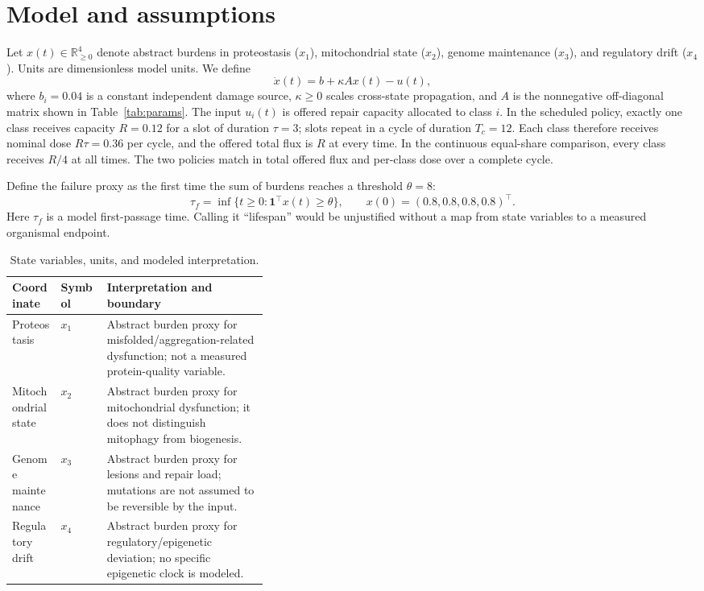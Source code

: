 \documentclass[10pt,letterpaper]{article}
\begin{document}
\section{Model and assumptions}
Let $x(t)\in\mathbb{R}_{\geq0}^{4}$ denote abstract burdens in proteostasis ($x_1$), mitochondrial state ($x_2$), genome maintenance ($x_3$), and regulatory drift ($x_4$). Units are dimensionless model units. We define
\begin{equation}
\dot{x}(t)=b+\kappa A x(t)-u(t), \label{eq:dyn}
\end{equation}
where $b_i=0.04$ is a constant independent damage source, $\kappa\geq0$ scales cross-state propagation, and $A$ is the nonnegative off-diagonal matrix shown in Table~\ref{tab:params}. The input $u_i(t)$ is offered repair capacity allocated to class $i$. In the scheduled policy, exactly one class receives capacity $R=0.12$ for a slot of duration $\tau=3$; slots repeat in a cycle of duration $T_c=12$. Each class therefore receives nominal dose $R\tau=0.36$ per cycle, and the offered total flux is $R$ at every time. In the continuous equal-share comparison, every class receives $R/4$ at all times. The two policies match in total offered flux and per-class dose over a complete cycle.

Define the failure proxy as the first time the sum of burdens reaches a threshold $\theta=8$:
\begin{equation}
\tau_f=\inf\{t\geq0:\mathbf{1}^{\top}x(t)\geq\theta\}, \qquad x(0)=(0.8,0.8,0.8,0.8)^{\top}. \label{eq:threshold}
\end{equation}
Here $\tau_f$ is a model first-passage time. Calling it “lifespan” would be unjustified without a map from state variables to a measured organismal endpoint.

\begin{table}[H]
\centering\small
\caption{State variables, units, and modeled interpretation.}
\label{tab:states}
\begin{tabularx}{\linewidth}{p{0.19\linewidth}p{0.18\linewidth}X}
\toprule
\textbf{Coordinate} & \textbf{Symbol} & \textbf{Interpretation and boundary}\\
\midrule
Proteostasis & $x_1$ & Abstract burden proxy for misfolded/aggregation-related dysfunction; not a measured protein-quality variable.\\
Mitochondrial state & $x_2$ & Abstract burden proxy for mitochondrial dysfunction; it does not distinguish mitophagy from biogenesis.\\
Genome maintenance & $x_3$ & Abstract burden proxy for lesions and repair load; mutations are not assumed to be reversible by the input.\\
Regulatory drift & $x_4$ & Abstract burden proxy for regulatory/epigenetic deviation; no specific epigenetic clock is modeled.\\
\bottomrule
\end{tabularx}
\end{table}
\end{document}
